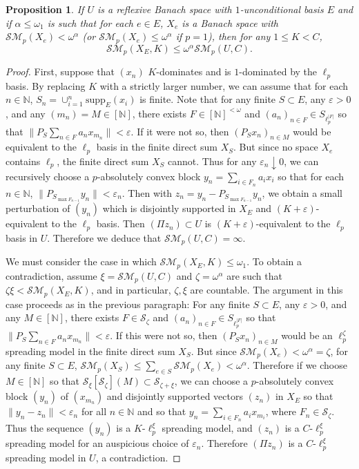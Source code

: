 \documentclass[12pt]{amsart}
\newtheorem{proposition}[theorem]{Proposition}
\theoremstyle{definition}
\newcommand{\fin}{[\mathbb{N}]^{<\omega}}
\newcommand{\infin}{[\mathbb{N}]}
\newcommand{\nn}{\mathbb{N}}
\newcommand{\sss}{\mathcal{S}}
\newcommand{\ssm}{\mathcal{SM}}
\newcommand{\supp}{\mathrm{supp}}
\begin{document}
\begin{proposition} If $U$ is a reflexive Banach space with $1$-unconditional basis $E$ and if $\alpha\leqslant \omega_1$ is such that for each $e\in E$, $X_e$ is a Banach space with $\ssm_p(X_e)< \omega^\alpha$ (or $\ssm_p(X_e)\leqslant \omega^\alpha$ if $p=1$), then for any $1\leqslant K<C$, $$\ssm_p(X_E, K) \leqslant \omega^\alpha \ssm_p(U, C).$$  


\end{proposition}

\begin{proof} First, suppose that $(x_n)$ $K$-dominates and is $1$-dominated by the $\ell_p$ basis.  By replacing $K$ with a strictly larger number, we can assume that for each $n\in \nn$, $S_n= \cup_{i=1}^n\supp_E(x_i)$ is finite.   Note that for any finite $S\subset E$, any $\varepsilon>0$,  and any $(m_n)=M\in \infin$, there exists $F\in \fin$ and $(a_n)_{n\in F}\in S_{\ell_p^{|F|}}$ so that $\|P_S\sum_{n\in F}a_n x_{m_n}\|< \varepsilon$.  If it were not so, then $(P_S x_n)_{n\in M}$ would be equivalent to the $\ell_p$ basis in the finite direct sum $X_S$.  But since no space $X_e$ contains $\ell_p$, the finite direct sum $X_S$ cannot.  Thus for any $\varepsilon_n\downarrow 0$, we can recursively choose a $p$-absolutely convex block $y_n=\sum_{i\in F_n} a_i x_i$ so that for each $n\in \nn$, $\|P_{S_{\max F_{n-1}}}y_n\|< \varepsilon_n$.  Then with $z_n= y_n- P_{S_{\max F_{n-1}}}y_n$, we obtain a small perturbation of $(y_n)$ which is disjointly supported in $X_E$ and $(K+\varepsilon)$-equivalent to the $\ell_p$ basis.  Then $(\Pi z_n)\subset U$ is $(K+\varepsilon)$-equivalent to the $\ell_p$ basis in $U$.  Therefore we deduce that $\ssm_p(U, C)=\infty$.  

We must consider the case in which $\ssm_p(X_E, K)\leqslant \omega_1$. To obtain a contradiction, assume $\xi= \ssm_p(U, C)$ and $\zeta= \omega^\alpha$ are such that $\zeta\xi<\ssm_p(X_E, K)$, and in particular, $\zeta, \xi$ are countable.  The argument in this case proceeds as in the previous paragraph: For any finite $S\subset E$, any $\varepsilon>0$, and any $M\in \infin$, there exists $F\in \sss_\zeta$ and $(a_n)_{n\in F}\in S_{\ell_p^{|F|}}$ so that $\|P_S\sum_{n\in F}a_n x_{m_n}\|< \varepsilon$.  If this were not so, then $(P_Sx_n)_{n\in M}$ would be an $\ell_p^\zeta$ spreading model in the finite direct sum $X_S$.  But since $\ssm_p(X_e)<\omega^\alpha= \zeta$, for any finite $S\subset E$, $\ssm_p(X_S) \leqslant \sum_{e\in S}\ssm_p(X_e)<\omega^\alpha$.  Therefore if we choose $M\in \infin$ so that $\sss_\xi[\sss_\zeta](M)\subset \sss_{\zeta+\xi}$, we can choose a $p$-absolutely convex block $(y_n)$ of $(x_{m_n})$ and disjointly supported vectors $(z_n)$ in $X_E$ so that $\|y_n-z_n\|<\varepsilon_n$ for all $n\in \nn$ and so that $y_n=\sum_{i\in F_n} a_i x_{m_i}$, where $F_n\in \sss_\zeta$.  Thus the sequence $(y_n)$ is a $K$-$\ell_p^\xi$ spreading model, and $(z_n)$ is a $C$-$\ell_p^\xi$ spreading model for an auspicious choice of $\varepsilon_n$.  Therefore $(\Pi z_n)$ is a $C$-$\ell_p^\xi$ spreading model in $U$, a contradiction.  



\end{proof}
\end{document}
